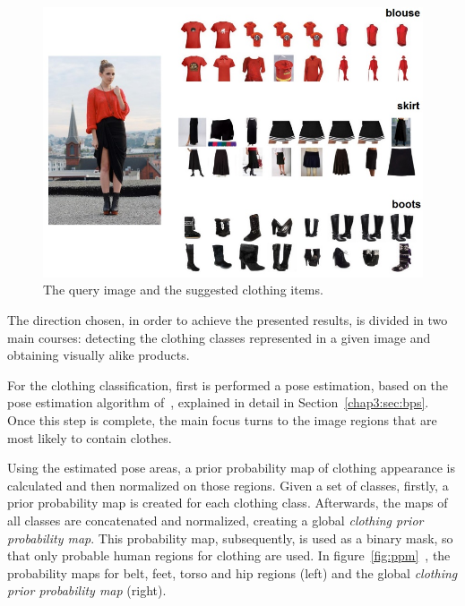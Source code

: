 \documentclass[titlepage,12pt,a4paper,times]{book}
\begin{document}
\begin{figure}[!h]
\centering
\includegraphics[scale=0.6]{images/2_4_fig1.jpg}
\caption{The query image and the suggested clothing items.}
\label{fig:qisci}
\end{figure}
\FloatBarrier

The direction chosen, in order to achieve the presented results, is divided in
two main courses: detecting the clothing classes represented in a given image
and obtaining visually alike products.

For the clothing classification, first is performed a pose estimation,
based on the pose estimation algorithm of~\citep{8}, explained in detail
in Section~\ref{chap3:sec:bps}. Once this step is complete, the main focus
turns to the image regions that are most likely to contain clothes.

Using the estimated pose areas, a prior probability map of clothing appearance
is calculated and then normalized on those regions. Given a set of classes,
firstly, a prior probability map is created for each clothing class.
Afterwards, the maps of all classes are concatenated and normalized,
creating a global \emph{clothing prior probability map}.
This probability map, subsequently, is used as a binary mask, so that only
probable human regions for clothing are used. In figure~\ref{fig:ppm}~\citep{3},
the probability maps for belt, feet, torso and hip regions (left) and
the global \emph{clothing prior probability map} (right).
\end{document}
